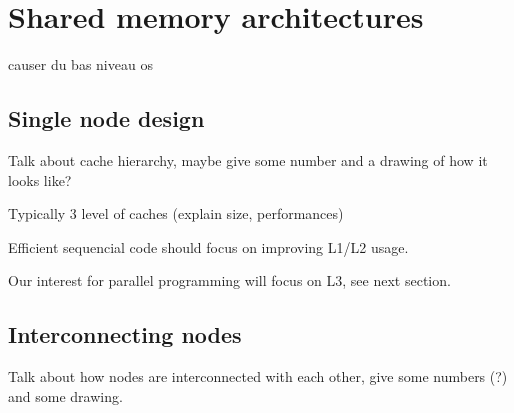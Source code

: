 \section{Shared memory architectures}\label{sec:context:numa}

causer du bas niveau os

\subsection{Single node design}

Talk about cache hierarchy, maybe give some number and a drawing of how it looks like?

Typically 3 level of caches (explain size, performances)

Efficient sequencial code should focus on improving L1/L2 usage.

Our interest for parallel programming will focus on L3, see next section.

\subsection{Interconnecting nodes}

Talk about how nodes are interconnected with each other, give some numbers (?) and some drawing.

